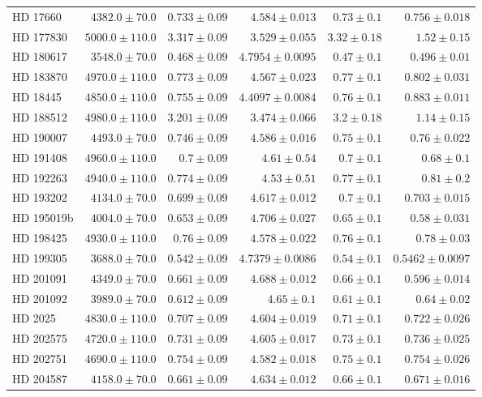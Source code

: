 \begin{longtable*}{lrrrrr}
HD 17660 & $4382.0\pm 70.0$ & $0.733\pm 0.09$ & $4.584\pm 0.013$ & $0.73\pm 0.1$ & $0.756\pm 0.018$ \\ 
HD 177830 & $5000.0\pm 110.0$ & $3.317\pm 0.09$ & $3.529\pm 0.055$ & $3.32\pm 0.18$ & $1.52\pm 0.15$ \\ 
HD 180617 & $3548.0\pm 70.0$ & $0.468\pm 0.09$ & $4.7954\pm 0.0095$ & $0.47\pm 0.1$ & $0.496\pm 0.01$ \\ 
HD 183870 & $4970.0\pm 110.0$ & $0.773\pm 0.09$ & $4.567\pm 0.023$ & $0.77\pm 0.1$ & $0.802\pm 0.031$ \\ 
HD 18445 & $4850.0\pm 110.0$ & $0.755\pm 0.09$ & $4.4097\pm 0.0084$ & $0.76\pm 0.1$ & $0.883\pm 0.011$ \\ 
HD 188512 & $4980.0\pm 110.0$ & $3.201\pm 0.09$ & $3.474\pm 0.066$ & $3.2\pm 0.18$ & $1.14\pm 0.15$ \\ 
HD 190007 & $4493.0\pm 70.0$ & $0.746\pm 0.09$ & $4.586\pm 0.016$ & $0.75\pm 0.1$ & $0.76\pm 0.022$ \\ 
HD 191408 & $4960.0\pm 110.0$ & $0.7\pm 0.09$ & $4.61\pm 0.54$ & $0.7\pm 0.1$ & $0.68\pm 0.1$ \\ 
HD 192263 & $4940.0\pm 110.0$ & $0.774\pm 0.09$ & $4.53\pm 0.51$ & $0.77\pm 0.1$ & $0.81\pm 0.2$ \\ 
HD 193202 & $4134.0\pm 70.0$ & $0.699\pm 0.09$ & $4.617\pm 0.012$ & $0.7\pm 0.1$ & $0.703\pm 0.015$ \\ 
HD 195019b & $4004.0\pm 70.0$ & $0.653\pm 0.09$ & $4.706\pm 0.027$ & $0.65\pm 0.1$ & $0.58\pm 0.031$ \\ 
HD 198425 & $4930.0\pm 110.0$ & $0.76\pm 0.09$ & $4.578\pm 0.022$ & $0.76\pm 0.1$ & $0.78\pm 0.03$ \\ 
HD 199305 & $3688.0\pm 70.0$ & $0.542\pm 0.09$ & $4.7379\pm 0.0086$ & $0.54\pm 0.1$ & $0.5462\pm 0.0097$ \\ 
HD 201091 & $4349.0\pm 70.0$ & $0.661\pm 0.09$ & $4.688\pm 0.012$ & $0.66\pm 0.1$ & $0.596\pm 0.014$ \\ 
HD 201092 & $3989.0\pm 70.0$ & $0.612\pm 0.09$ & $4.65\pm 0.1$ & $0.61\pm 0.1$ & $0.64\pm 0.02$ \\ 
HD 2025 & $4830.0\pm 110.0$ & $0.707\pm 0.09$ & $4.604\pm 0.019$ & $0.71\pm 0.1$ & $0.722\pm 0.026$ \\ 
HD 202575 & $4720.0\pm 110.0$ & $0.731\pm 0.09$ & $4.605\pm 0.017$ & $0.73\pm 0.1$ & $0.736\pm 0.025$ \\ 
HD 202751 & $4690.0\pm 110.0$ & $0.754\pm 0.09$ & $4.582\pm 0.018$ & $0.75\pm 0.1$ & $0.754\pm 0.026$ \\ 
HD 204587 & $4158.0\pm 70.0$ & $0.661\pm 0.09$ & $4.634\pm 0.012$ & $0.66\pm 0.1$ & $0.671\pm 0.016$ \\ 

\end{longtable*}
